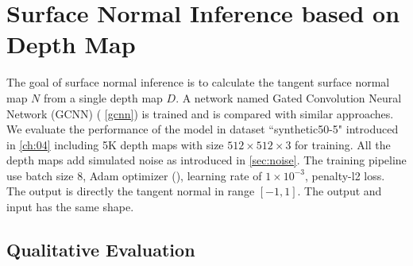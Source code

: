 \documentclass[border=15pt, multi, tikz]{article}
\begin{document}
\section{Surface Normal Inference based on Depth Map}
The goal of surface normal inference is to calculate the tangent surface normal map $ N $ from a single depth map $ D $. A network named Gated Convolution Neural Network (GCNN) ( \ref{gcnn}) is trained and is compared with similar approaches. We evaluate the performance of the model in dataset ``synthetic50-5" introduced in  \ref{ch:04} including 5K depth maps with size  $ 512\times512\times3 $ for training. All the depth maps add simulated noise as introduced in \ref{sec:noise}. The training pipeline use batch size $ 8 $,  Adam optimizer (\cite{adam}), learning rate of  $ 1\times10^{-3} $, penalty-l2 loss. The output is directly the tangent normal in range $ \left[-1,1\right] $. The output and input has the same shape. 

\subsection{Qualitative Evaluation}
\end{document}
